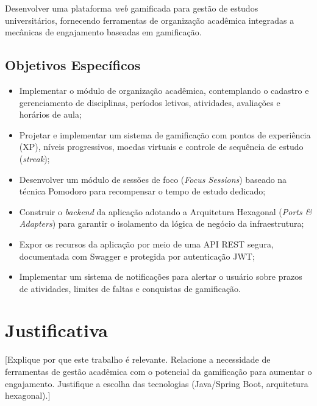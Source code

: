 Desenvolver uma plataforma \textit{web} gamificada para gestão de estudos
universitários, fornecendo ferramentas de organização acadêmica integradas a
mecânicas de engajamento baseadas em gamificação.

\subsection{Objetivos Específicos}
\label{subsec:objetivos-especificos}

\begin{itemize}
  \item Implementar o módulo de organização acadêmica, contemplando o cadastro e
        gerenciamento de disciplinas, períodos letivos, atividades, avaliações e
        horários de aula;

  \item Projetar e implementar um sistema de gamificação com pontos de experiência
        (XP), níveis progressivos, moedas virtuais e controle de sequência de estudo
        (\textit{streak});

  \item Desenvolver um módulo de sessões de foco (\textit{Focus Sessions}) baseado
        na técnica Pomodoro para recompensar o tempo de estudo dedicado;

  \item Construir o \textit{backend} da aplicação adotando a Arquitetura Hexagonal
        (\textit{Ports \& Adapters}) para garantir o isolamento da lógica de negócio
        da infraestrutura;

  \item Expor os recursos da aplicação por meio de uma API REST segura, documentada
        com Swagger e protegida por autenticação JWT;

  \item Implementar um sistema de notificações para alertar o usuário sobre prazos
        de atividades, limites de faltas e conquistas de gamificação.
\end{itemize}

\section{Justificativa}
\label{sec:justificativa}

[Explique por que este trabalho é relevante. Relacione a necessidade de ferramentas
de gestão acadêmica com o potencial da gamificação para aumentar o engajamento.
Justifique a escolha das tecnologias (Java/Spring Boot, arquitetura hexagonal).]

